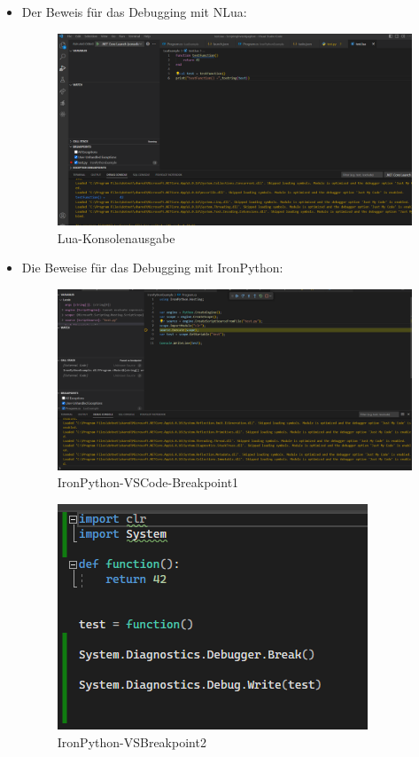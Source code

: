 \begin{itemize}
    \item Der Beweis für das Debugging mit NLua:
    
    \begin{figure}[H]
        \centering
        \includegraphics[scale=0.35]{pics/Lua-Konsolenausgabe.png}
        \caption{Lua-Konsolenausgabe}
        \label{fig:impl:KonsolenausgabeLua}
    \end{figure}

\newpage
    \item Die Beweise für das Debugging mit IronPython:
    \begin{figure}[H]
        \centering
        \includegraphics[scale=0.35]{pics/IronPythonVSCodeBreakpoint1.png}
        \caption{IronPython-VSCode-Breakpoint1}
        \label{fig:impl:IronPythonVSCodeBreakpoint1}
    \end{figure}

    \begin{figure}[H]
        \centering
        \includegraphics{pics/IronPythonVSBreakpoint2.png}
        \caption{IronPython-VSBreakpoint2}
        \label{fig:impl:IronPythonVSBreakpoint2}
    \end{figure}


\end{itemize}
